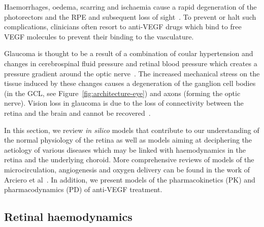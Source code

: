 \documentclass{article}
\begin{document}
Haemorrhages, oedema, scarring and ischaemia cause a rapid degeneration of the photorectors and the RPE and subsequent loss of sight~\cite{Gupta_2015,Jager_2008}.
To prevent or halt such complications, clinicians often resort to anti-VEGF drugs which bind to free VEGF molecules to prevent their binding to the vasculature.

Glaucoma is thought to be a result of a combination of coular hypertension and changes in cerebrospinal fluid pressure and retinal blood pressure which creates a pressure gradient around the optic nerve~\cite{Band_2009,Nickells_2012}.
The increased mechanical stress on the tissue induced by these changes causes a degeneration of the ganglion cell bodies (in the GCL, see Figure~\ref{fig:architecture-eye}) and axons (forming the optic nerve).
Vision loss in glaucoma is due to the loss of connectivity between the retina and the brain and cannot be recovered~\cite{Quigley_2011}.


In this section, we review \textit{in silico} models that contribute to our understanding of the normal physiology of the retina as well as models aiming at deciphering the aetiology of various diseases which may be linked with haemodynamics in the retina and the underlying choroid.
More comprehensive reviews of models of the microcirculation, angiogenesis and oxygen delivery can be found in the work of Arciero et al~\cite{Arciero_2017, Arciero_2019}.
In addition, we present models of the pharmacokinetics (PK) and pharmacodynamics (PD) of anti-VEGF treatment.


\subsection{Retinal haemodynamics} \label{subsec:RetinalHaemodynamics}
\end{document}
